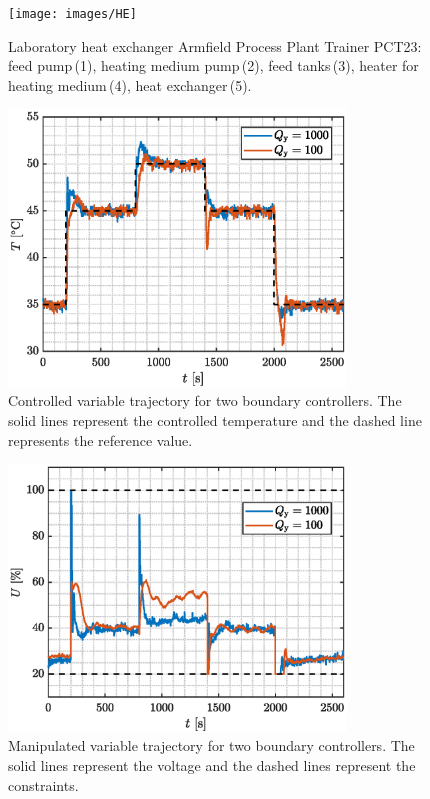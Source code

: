 \documentclass[preprint,12pt]{elsarticle}
\begin{document}
\begin{figure}
	\begin{center}
		\texttt{[image: images/HE]}
		\caption[Heat exchanger Armfield Process Plant Trainer PCT23]{Laboratory heat exchanger Armfield Process Plant Trainer PCT23: feed pump\,(1), heating medium pump\,(2), feed tanks\,(3), heater for heating medium\,(4), heat exchanger\,(5).}
		\label{fig:HE}
	\end{center}
\end{figure}

\begin{figure}
	\begin{center}
		\includegraphics[width=0.8\textwidth]{images/CV_boundaries}
		\caption{Controlled variable trajectory for two boundary controllers. The solid lines represent the controlled temperature and the dashed line represents the reference value.}
		\label{fig:CV_boundaries}
	\end{center}
\end{figure}

\begin{figure}
	\begin{center}
		\includegraphics[width=0.8\textwidth]{images/MV_boundaries}
		\caption{Manipulated variable trajectory for two boundary controllers. The solid lines represent the voltage and the dashed lines represent the constraints.}
		\label{fig:MV_boundaries}
	\end{center}
\end{figure}
\end{document}

